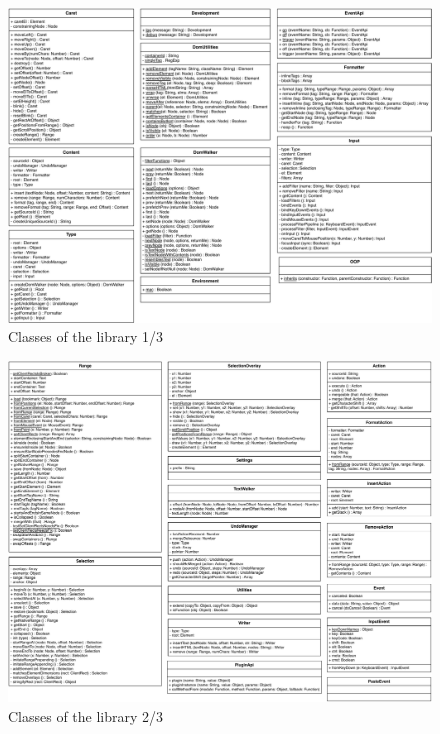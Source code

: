 \clearpage
\newpage

\begin{landscape}
  \begin{figure}[htb]
    \centerline{\includegraphics[width=.9\linewidth]{images/ClassesType-1}}
    \caption{Classes of the library 1/3}
    \label{fig:classes_type_one}
  \end{figure}
\end{landscape}

\clearpage
\newpage

\begin{landscape}
  \begin{figure}[htb]
    \centerline{\includegraphics[width=.75\linewidth]{images/ClassesType-2}}
    \caption{Classes of the library 2/3}
    \label{fig:classes_type_two}
  \end{figure}
\end{landscape}

\clearpage
\newpage

